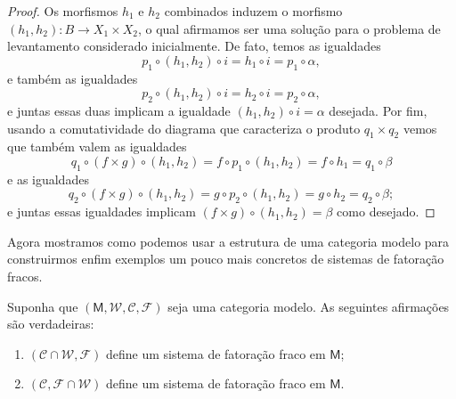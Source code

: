 \begin{proof}
  Os morfismos $h_{1}$ e $h_{2}$ combinados induzem o morfismo $(h_{1},h_{2}): B \to X_{1} \times X_{2}$, o qual afirmamos ser uma solução para o problema de levantamento considerado inicialmente.
  De fato, temos as igualdades
  \begin{displaymath}
    p_{1} \circ (h_{1},h_{2}) \circ i = h_{1} \circ i = p_{1} \circ \alpha,
  \end{displaymath}
  e também as igualdades
  \begin{displaymath}
    p_{2} \circ (h_{1},h_{2}) \circ i = h_{2} \circ i = p_{2} \circ \alpha,
  \end{displaymath}
  e juntas essas duas implicam a igualdade $(h_{1},h_{2}) \circ i = \alpha$ desejada.
  Por fim, usando a comutatividade do diagrama que caracteriza o produto $q_{1} \times q_{2}$ vemos que também valem as igualdades
  \begin{displaymath}
    q_{1} \circ (f \times g) \circ (h_{1},h_{2}) = f \circ p_{1} \circ (h_{1},h_{2}) = f \circ h_{1} = q_{1} \circ \beta
  \end{displaymath}
  e as igualdades
  \begin{displaymath}
    q_{2} \circ (f \times g) \circ (h_{1},h_{2}) = g \circ p_{2} \circ (h_{1},h_{2}) = g \circ h_{2} = q_{2} \circ \beta;
  \end{displaymath}
  e juntas essas igualdades implicam $(f \times g) \circ (h_{1},h_{2}) = \beta$ como desejado.
\end{proof}

Agora mostramos como podemos usar a estrutura de uma categoria modelo para construirmos enfim exemplos um pouco mais concretos de sistemas de fatoração fracos.

\begin{prop}\label{prop:categoria_modelo_induz_sistemas_de_fatoracao}
  Suponha que $(\mathsf{M},\mathcal{W},\mathcal{C},\mathcal{F})$ seja uma categoria modelo.
  As seguintes afirmações são verdadeiras:
  \begin{enumerate}
  \item $(\mathcal{C} \cap \mathcal{W},\mathcal{F})$ define um sistema de fatoração fraco em $\mathsf{M}$;
    
  \item $(\mathcal{C},\mathcal{F} \cap \mathcal{W})$ define um sistema de fatoração fraco em $\mathsf{M}$.
  \end{enumerate}
\end{prop}

